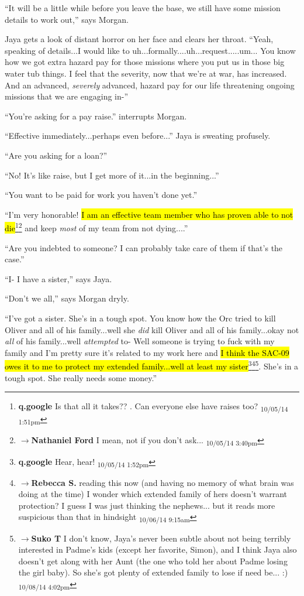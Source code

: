 ``It will be a little while before you leave the base, we still have some mission details to work out,'' says Morgan.

Jaya gets a look of distant horror on her face and clears her throat. ``Yeah, speaking of details...I would like to uh...formally....uh...request.....um... You know how we got extra hazard pay for those missions where you put us in those big water tub things.  I feel that the severity, now that we're at war, has increased.  And an advanced, \textit{severely} advanced, hazard pay for our life threatening ongoing missions that we are engaging in-''

``You're asking for a pay raise.'' interrupts Morgan.

``Effective immediately...perhaps even before...'' Jaya is sweating profusely.

``Are you asking for a loan?''

``No!  It's like raise, but I get more of it...in the beginning...''

``You want to be paid for work you haven't done yet.''

``I'm very honorable!  \hl{I am an effective team member who has proven able to not die}\footnote{\textbf{q.google }Is that all it takes??  .  Can everyone else have raises too? \textsubscript{10/05/14 1:51pm}}\footnote{$\rightarrow$\textbf{Nathaniel Ford }I mean, not if you don't ask... \textsubscript{10/05/14 3:40pm}} and keep \textit{most} of my team from not dying....''

``Are you indebted to someone?  I can probably take care of them if that's the case.''

``I- I have a sister,'' says Jaya.

``Don't we all,'' says Morgan dryly.

``I've got a sister.  She's in a tough spot.  You know how the Orc tried to kill Oliver and all of his family...well she \textit{did} kill Oliver and all of his family...okay not \textit{all} of his family...well \textit{attempted} to-  Well someone is trying to fuck with my family and I'm pretty sure it's related to my work here and \hl{I think the SAC-09 owes it to me to protect my extended family...well at least my sister}\footnote{\textbf{q.google }Hear, hear! \textsubscript{10/05/14 1:52pm}}\footnote{$\rightarrow$\textbf{Rebecca S. }reading this now (and having no memory of what brain was doing at the time) I wonder which extended family of hers doesn't warrant protection?  I guess I was just thinking the nephews... but it reads more suspicious than that in hindsight \textsubscript{10/06/14 9:15am}}\footnote{$\rightarrow$\textbf{Suko T }I don't know, Jaya's never been subtle about not being terribly interested in Padme's kids (except her favorite, Simon), and I think Jaya also doesn't get along with her Aunt (the one who told her about Padme losing the girl baby).  So she's got plenty of extended family to lose if need be... :) \textsubscript{10/08/14 4:02pm}}.  She's in a tough spot.  She really needs some money.''


